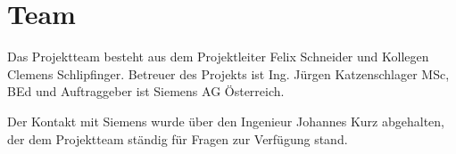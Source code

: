 \section{Team}

Das Projektteam besteht aus dem Projektleiter Felix Schneider und Kollegen Clemens Schlipfinger. Betreuer des Projekts ist Ing. Jürgen Katzenschlager MSc, BEd und Auftraggeber ist Siemens AG Österreich.

Der Kontakt mit Siemens wurde über den Ingenieur Johannes Kurz abgehalten, der dem Projektteam ständig für Fragen zur Verfügung stand.